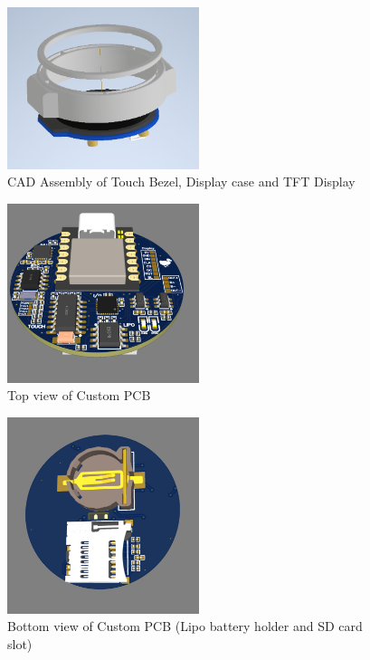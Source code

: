\documentclass[12pt, titlepage]{article}
\begin{document}
\begin{figure}[H]
	\begin{center}
		 \includegraphics[width=0.5\textwidth]{WatchCAD}
		\caption{CAD Assembly of Touch Bezel, Display case and TFT Display}
		\label{WatchCAD} 
	\end{center}
\end{figure}

\begin{figure}[H]
	\begin{center}
		 \includegraphics[width=0.5\textwidth]{PCBTOP}
		\caption{Top view of Custom PCB}
		\label{PCBTOP} 
	\end{center}
\end{figure}

\begin{figure}[H]
	\begin{center}
		 \includegraphics[width=0.5\textwidth]{PCBBOTTOM}
		\caption{Bottom view of Custom PCB (Lipo battery holder and SD card slot)}
		\label{PCBBOTTOM} 
	\end{center}
\end{figure}
\end{document}
